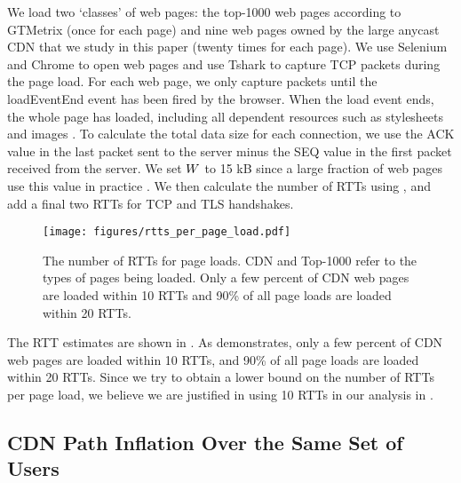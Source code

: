 \documentclass[sigconf,letterpaper,nonacm,10pt,anonymous]{acmart}
\begin{document}
We load two `classes' of web pages: the top-1000 web pages according to
GTMetrix \cite{gtmetrix} (once for each page) and nine web pages owned
by the large anycast CDN that we study in this paper (twenty times for
each page). We use Selenium and Chrome to open web pages and use Tshark
\cite{tshark} to capture TCP packets during the page load. For each web
page, we only capture packets until the loadEventEnd event has been
fired by the browser. When the load event ends, the whole page has
loaded, including all dependent resources such as stylesheets and images
\cite{web_api_load_event}. To calculate the total data size for each
connection, we use the ACK value in the last packet sent to the server
minus the SEQ value in the first packet received from the server. We set
\(\mathnormal{W}\) to 15 kB since a large fraction of web pages use this
value in practice \cite{iwIMC17}. We then calculate the number of RTTs
using , and add a final two RTTs for TCP and
TLS handshakes.

\begin{figure}
    \centering
    \texttt{[image: figures/rtts\_per\_page\_load.pdf]}
    \caption{The number of RTTs for page loads. CDN and Top-1000 refer to the types of pages being loaded. Only a few percent of CDN web pages are loaded within 10 RTTs and 90\% of all page loads are loaded within 20 RTTs.}
    \label{fig:rtts_per_page_load}
\end{figure}

The RTT estimates are shown in . As
 demonstrates, only a few percent of CDN
web pages are loaded within 10 RTTs, and 90\% of all page loads are
loaded within 20 RTTs. Since we try to obtain a lower bound on the
number of RTTs per page load, we believe we are justified in using 10
RTTs in our analysis in .

\subsection{CDN Path Inflation Over the Same Set of
Users}\label{cdn-path-inflation-over-the-same-set-of-users}

\label{ap:anycast_cdn_path_inflation_recalc}

\iffalse

Holding set of users constant across rings Case studies of why users
don't visit their closest site

\fi
\end{document}
